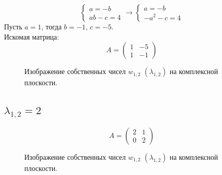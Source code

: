 \documentclass[a5paper, 10pt]{article}
\theoremstyle{definition}
\theoremstyle{plain}
\theoremstyle{remark}
\begin{document}
\begin{equation}
\begin{cases}
a = -b\\
ab - c = 4
\end{cases}
\to
\begin{cases}
a = -b\\
-a^2 - c = 4
\end{cases}
\end{equation}
Пусть $ a = 1$, тогда $b = -1$, $c = -5 $.\\
Искомая матрица:
\begin{equation}
A =
\begin{pmatrix}
1 &  -5  \\
1 & -1
\end{pmatrix}
\end{equation}
\begin{figure}[h!]
\caption{Изображение собственных чисел $w_{1, 2} \, \, \left( \lambda_{1, 2} \right)$ на комплексной плоскости.}
\end{figure}

\newpage
\subsection{$\lambda_{1, 2} = 2$}
\begin{equation}
A =
\begin{pmatrix}
 2 &  1\\
0 &  2
\end{pmatrix}
\end{equation}
\begin{figure}[h!]
\caption{Изображение собственных чисел $w_{1, 2} \, \, \left( \lambda_{1, 2} \right)$ на комплексной плоскости.}
\end{figure}
\end{document}
